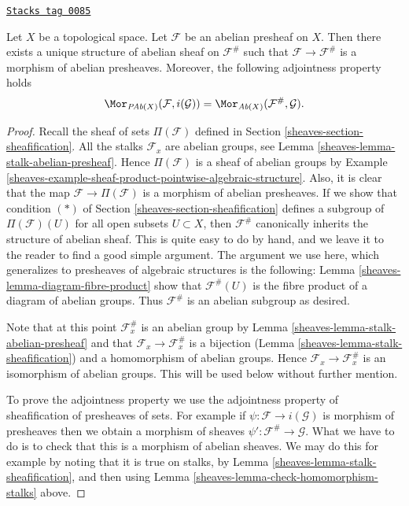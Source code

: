 \begin{lemma}
\label{sheaves-lemma-sheafify-abelian-presheaf}
\href{https://stacks.math.columbia.edu/tag/0085}{\texttt{Stacks tag 0085}}

Let $X$ be a topological space.
Let $\mathcal{F}$ be an abelian presheaf on $X$.
Then there exists a unique structure of
abelian sheaf on $\mathcal{F}^\#$ such that
$\mathcal{F} \to \mathcal{F}^\#$ is a morphism
of abelian presheaves. Moreover, the following adjointness
property holds
$$
\Mor_{\textit{PAb}(X)}(\mathcal{F}, i(\mathcal{G}))
=
\Mor_{\textit{Ab}(X)}(\mathcal{F}^\#, \mathcal{G}).
$$
\end{lemma}

\begin{proof}

Recall the sheaf of sets $\Pi(\mathcal{F})$ defined in
Section \ref{sheaves-section-sheafification}. All the stalks
$\mathcal{F}_x$ are abelian groups, see
Lemma \ref{sheaves-lemma-stalk-abelian-presheaf}.
Hence $\Pi(\mathcal{F})$ is a sheaf of abelian groups by
Example \ref{sheaves-example-sheaf-product-pointwise-algebraic-structure}.
Also, it is clear that the map $\mathcal{F} \to \Pi(\mathcal{F})$
is a morphism of abelian presheaves. If we show that
condition $(*)$ of Section \ref{sheaves-section-sheafification} defines a subgroup
of $\Pi(\mathcal{F})(U)$ for all open subsets $U \subset X$,
then $\mathcal{F}^\#$ canonically inherits the structure of abelian sheaf.
This is quite easy to do by hand, and we leave it to the
reader to find a good simple argument. The argument we use here,
which generalizes to presheaves of algebraic structures is the following:
Lemma \ref{sheaves-lemma-diagram-fibre-product} show that
$\mathcal{F}^\#(U)$ is the fibre product of a diagram
of abelian groups. Thus $\mathcal{F}^\#$ is an abelian
subgroup as desired.

\medskip\noindent
Note that at this point $\mathcal{F}^\#_x$ is an abelian
group by Lemma \ref{sheaves-lemma-stalk-abelian-presheaf}
and that $\mathcal{F}_x \to \mathcal{F}^\#_x$ is a
bijection (Lemma \ref{sheaves-lemma-stalk-sheafification})
and a homomorphism of abelian groups. Hence
$\mathcal{F}_x \to \mathcal{F}^\#_x$ is an isomorphism
of abelian groups. This will be used below without further mention.

\medskip\noindent
To prove the adjointness property we use the adjointness
property of sheafification of presheaves of sets. For example
if $\psi : \mathcal{F} \to i(\mathcal{G})$ is morphism of presheaves
then we obtain a morphism of sheaves
$\psi' : \mathcal{F}^\# \to \mathcal{G}$. What we have to do is to check
that this is a morphism of abelian sheaves. We may do this
for example by noting that it is true on stalks,
by Lemma \ref{sheaves-lemma-stalk-sheafification}, and then using
Lemma \ref{sheaves-lemma-check-homomorphism-stalks} above.
\end{proof}


